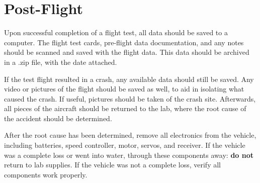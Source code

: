 \section{Post-Flight}
Upon successful completion of a flight test, all data should be saved to a computer. The flight test cards, pre-flight data documentation, and any notes should be scanned and saved with the flight data. This data should be archived in a .zip file, with the date attached.

If the test flight resulted in a crash, any available data should still be saved. Any video or pictures of the flight should be saved as well, to aid in isolating what caused the crash. If useful, pictures should be taken of the crash site. Afterwards, all pieces of the aircraft should be returned to the lab, where the root cause of the accident should be determined.

After the root cause has been determined, remove all electronics from the vehicle, including batteries, speed controller, motor, servos, and receiver. If the vehicle was a complete loss or went into water, through these components away: \textbf{do not} return to lab supplies. If the vehicle was not a complete loss, verify all components work properly.